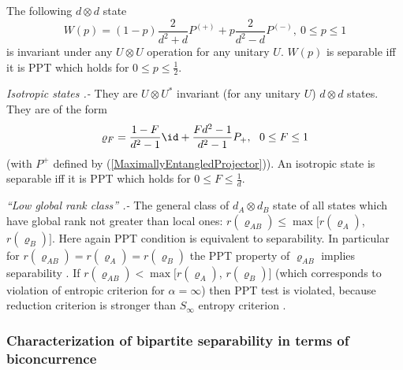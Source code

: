 \documentclass[twocolumn,aps,rmp]{revtex4}
\begin{document}
The following $d \otimes d$ state
\begin{equation}
W(p)=(1-p)\frac{2}{d^{2}+d}P^{(+)}+p\frac{2}{d^{2}-d}P^{(-)}, \ 0\leq p
\leq 1 \label{Werner-state}
\end{equation}
is invariant under any $U \otimes U$ operation for any unitary $U$.
$W(p)$ is separable iff it is PPT which holds for $0 \leq p \leq
\frac{1}{2}$.

{\it Isotropic states \cite{reduction} .-} They are $U \otimes U^{*}$
invariant (for any unitary $U$) $d \otimes d$ states. They are of the
form
\begin{equation}
\varrho_{F}={1-F\over d^2-1} \id +{Fd^2-1\over d^2 -1} P_+,\ \
0\leq F \leq 1 \label{ntryplet}
\end{equation}
(with $P^{+}$ defined by (\ref{MaximallyEntangledProjector})).  An
isotropic state is separable iff it is PPT which holds for $0\leq F
\leq \frac{1}{d}$.

{\it ``Low global rank class'' \cite{Ho00} .-} The general class of
$d_{A} \otimes d_{B}$ state of all states which have global rank not
greater than local ones: $r(\varrho_{AB})\leq \max [r(\varrho_{A})$,
$r(\varrho_{B})]$.  Here again PPT condition is equivalent to
separability. In particular for
$r(\varrho_{AB})=r(\varrho_{A})=r(\varrho_{B})$ the PPT property of
$\varrho_{AB}$ implies separability \cite{Ho00}. If
$r(\varrho_{AB})<\max[r(\varrho_{A})$, $r(\varrho_{B})]$ (which
corresponds to violation of entropic criterion for $\alpha=\infty$)
then PPT test is violated, because reduction criterion is stronger
than $S_{\infty}$ entropy criterion \cite{HSTT}.



\subsubsection{Characterization of bipartite separability in terms of
biconcurrence}
\end{document}
